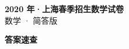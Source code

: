\documentclass[zihao=-4, a4paper]{ctexart}
\begin{document}
\begin{center}
  {\Large\bfseries 2020 年·上海春季招生数学试卷}\\[4pt]
  {\large 数学 · 简答版}
\end{center}
\medskip
{}

\clearpage
{}
\begin{center}{\Large\bfseries 答案速查}\end{center}
\medskip

\end{document}
